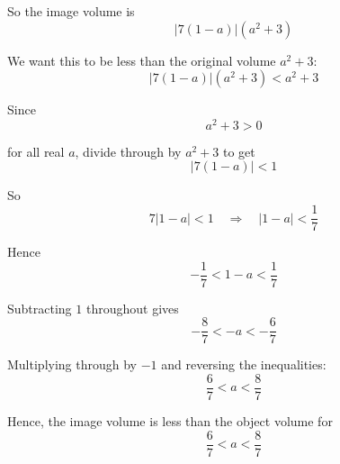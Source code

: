 \documentclass[leqno]{article}
\begin{document}
\begin{enumerate}[
  label=\textbf{\arabic*.},
  leftmargin=*,
  topsep=0pt,
  partopsep=0pt,
  parsep=0pt
]
\begin{djsSolution}
\begin{enumerate}[label=\textbf{(\alph*)}]
\begin{enumerate}[label=(\roman*)]
So the image volume is
\[
|7(1-a)|(a^2+3)
\]

We want this to be less than the original volume $a^2+3$:
\[
|7(1-a)|(a^2+3)<a^2+3
\]

Since
\[
a^2+3>0
\]

for all real $a$, divide through by $a^2+3$ to get
\[
|7(1-a)|<1
\]

So
\[
7|1-a|<1\quad\Longrightarrow\quad |1-a|<\frac{1}{7}
\]

Hence
\[
-\frac{1}{7}<1-a<\frac{1}{7}
\]

Subtracting $1$ throughout gives
\[
-\frac{8}{7}<-a<-\frac{6}{7}
\]

Multiplying through by $-1$ and reversing the inequalities:
\[
\frac{6}{7}<a<\frac{8}{7}
\]

Hence, the image volume is less than the object volume for
\[
\frac{6}{7}<a<\frac{8}{7}
\]
  \end{enumerate}
\end{enumerate}
\end{djsSolution}


\end{enumerate}
\end{document}
